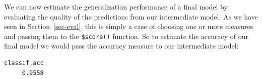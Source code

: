 \begin{Shaded}
\begin{Highlighting}[]
\OtherTok{=} \NormalTok{(}\NormalTok{)}
\OtherTok{=} 
\OtherTok{=} \NormalTok{(}\NormalTok{)}
\SpecialCharTok{$}\SpecialCharTok{$}
\OtherTok{=}\SpecialCharTok{$}\SpecialCharTok{$}
\end{Highlighting}
\end{Shaded}

We can now estimate the generalization performance of a final model by
evaluating the quality of the predictions from our intermediate model.
As we have seen in Section~\ref{sec-eval}, this is simply a case of
choosing one or more measures and passing them to the \texttt{\$score()}
function. So to estimate the accuracy of our final model we would pass
the accuracy measure to our intermediate model:

\begin{Shaded}
\begin{Highlighting}[]
\SpecialCharTok{$}\NormalTok{(}\NormalTok{(}\NormalTok{))}
\end{Highlighting}
\end{Shaded}

\begin{verbatim}
classif.acc 
     0.9558 
\end{verbatim}

